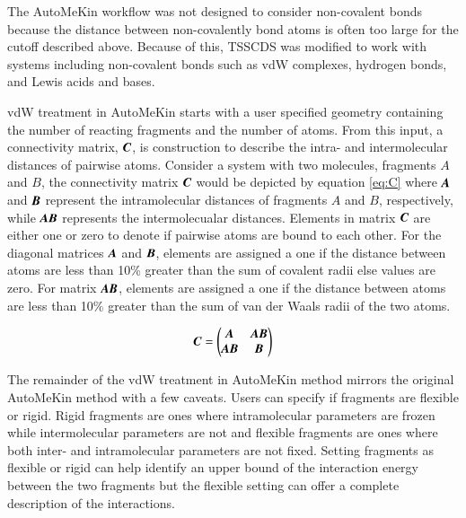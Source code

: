 \documentclass[preprint, 11pt]{elsarticle} %
\begin{document}
The AutoMeKin workflow was not designed to consider non-covalent bonds because the distance between non-covalently bond atoms is often too large for the cutoff described above.
Because of this, TSSCDS was modified to work with systems including non-covalent bonds such as vdW complexes, hydrogen bonds, and Lewis acids and bases.

vdW treatment in AutoMeKin starts with a user specified geometry containing the number of reacting fragments and the number of atoms.
From this input, a connectivity matrix, $\textbf{\textit{C}}$, is construction to describe the intra- and intermolecular distances of pairwise atoms.
Consider a system with two molecules, fragments $\textit{A}$ and $\textit{B}$, the connectivity matrix $\textbf{\textit{C}}$ would be depicted by equation \ref{eq:C} where $\textbf{\textit{A}}$ and $\textbf{\textit{B}}$ represent the intramolecular distances of fragments $\textit{A}$ and $\textit{B}$, respectively, while $\textit{\textbf{AB}}$ represents the intermolecualar distances.
Elements in matrix $\textbf{\textit{C}}$ are either one or zero to denote if pairwise atoms are bound to each other.
For the diagonal matrices $\textbf{\textit{A}}$ and $\textbf{\textit{B}}$, elements are assigned a one if the distance between atoms are less than 10\% greater than the sum of covalent radii else values are zero.
For matrix $\textbf{\textit{AB}}$, elements are assigned a one if the distance between atoms are less than 10\% greater than the sum of van der Waals radii of the two atoms.

\begin{equation}
    \textbf{\textit{C}} = \begin{pmatrix}
\textbf{\textit{A}} & \textbf{\textit{AB}} \\
\textbf{\textit{AB}} & \textbf{\textit{B}}
\end{pmatrix}
\label{eq:C}
\end{equation}

The remainder of the vdW treatment in AutoMeKin method mirrors the original AutoMeKin method with a few caveats.
Users can specify if fragments are flexible or rigid.
Rigid fragments are ones where intramolecular parameters are frozen while intermolecular parameters are not and flexible fragments are ones where both inter- and intramolecular parameters are not fixed. 
Setting fragments as flexible or rigid can help identify an upper bound of the interaction energy between the two fragments but the flexible setting can offer a complete description of the interactions.
\end{document}
